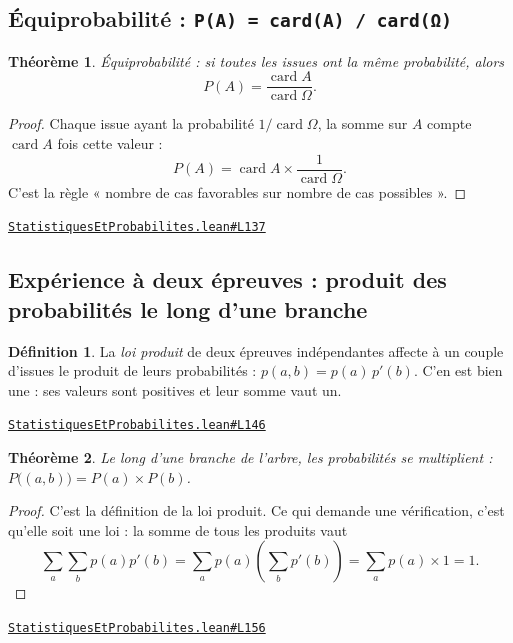 \documentclass[11pt,a4paper]{article}
\theoremstyle{definition}
\newtheorem{definition}{Définition}
\theoremstyle{plain}
\newtheorem{theoreme}{Théorème}
\newcommand{\source}[2]{\par\smallskip\noindent\hfill{\footnotesize\href{#1}{\texttt{#2}}}\par\smallskip}
\begin{document}
\subsection{Équiprobabilité : \texttt{P(A) = card(A) / card(Ω)}}

\begin{theoreme}
Équiprobabilité : si toutes les issues ont la même probabilité, alors
\[ P(A) = \frac{\operatorname{card} A}{\operatorname{card} \Omega} . \]
\end{theoreme}

\begin{proof}
Chaque issue ayant la probabilité $1/\operatorname{card}\Omega$, la somme sur $A$
compte $\operatorname{card} A$ fois cette valeur :
\[ P(A) = \operatorname{card} A \times \frac{1}{\operatorname{card}\Omega} . \]
C'est la règle « nombre de cas favorables sur nombre de cas possibles ».
\end{proof}
\source{https://github.com/Commutator-IO/learn-lean/blob/main/courses/01-college/06-statistiques-et-probabilites/StatistiquesEtProbabilites.lean\#L137}{StatistiquesEtProbabilites.lean\#L137}

\subsection{Expérience à deux épreuves : produit des probabilités le long d'une branche}

\begin{definition}
La \emph{loi produit} de deux épreuves indépendantes affecte à un couple d'issues le
produit de leurs probabilités : $p(a, b) = p(a)\,p'(b)$. C'en est bien une : ses valeurs
sont positives et leur somme vaut un.
\end{definition}
\source{https://github.com/Commutator-IO/learn-lean/blob/main/courses/01-college/06-statistiques-et-probabilites/StatistiquesEtProbabilites.lean\#L146}{StatistiquesEtProbabilites.lean\#L146}

\begin{theoreme}
Le long d'une branche de l'arbre, les probabilités se multiplient :
$P\bigl((a, b)\bigr) = P(a) \times P(b)$.
\end{theoreme}

\begin{proof}
C'est la définition de la loi produit. Ce qui demande une vérification, c'est qu'elle
soit une loi : la somme de tous les produits vaut
\[ \sum_{a}\sum_{b} p(a)p'(b) = \sum_a p(a) \left(\sum_b p'(b)\right)
   = \sum_a p(a) \times 1 = 1 . \]
\end{proof}
\source{https://github.com/Commutator-IO/learn-lean/blob/main/courses/01-college/06-statistiques-et-probabilites/StatistiquesEtProbabilites.lean\#L156}{StatistiquesEtProbabilites.lean\#L156}
\end{document}
